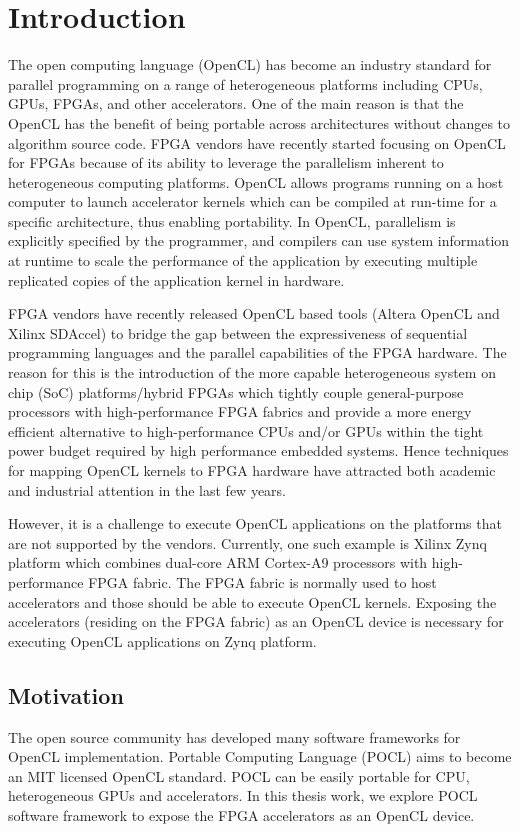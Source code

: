 \chapter{Introduction}
\label{ch1_introduction}
The open computing language (OpenCL) has become an industry standard for parallel programming on a range of heterogeneous platforms including CPUs, GPUs, FPGAs, and other accelerators. One of the main reason is that the OpenCL has the benefit of being portable across architectures without changes to algorithm source code.
FPGA vendors have recently started focusing on OpenCL for FPGAs because of its ability to leverage the parallelism inherent to heterogeneous computing platforms. OpenCL allows programs running on a host computer to launch accelerator kernels which can be compiled at run-time for a specific architecture, thus enabling portability.
In OpenCL, parallelism is explicitly specified by the programmer, and compilers can use system information at runtime to scale the performance of the application by executing multiple replicated copies of the application kernel in hardware.

FPGA vendors have recently released OpenCL based tools (Altera OpenCL and Xilinx SDAccel) to bridge the gap between the expressiveness of sequential programming languages and the parallel capabilities of the FPGA hardware. The reason for this is the introduction of the more capable heterogeneous system on chip (SoC) platforms/hybrid FPGAs which tightly couple general-purpose processors with high-performance FPGA fabrics and provide a more energy efficient alternative to high-performance CPUs and/or GPUs
within the tight power budget required by high performance embedded systems. Hence techniques for mapping OpenCL kernels to FPGA hardware have attracted both academic and industrial attention in the last few years.

However, it is a challenge to execute OpenCL applications on the platforms that are not supported by the vendors. Currently, one such example is Xilinx Zynq platform which combines dual-core ARM Cortex-A9 processors with high-performance FPGA fabric. The FPGA fabric is normally used to host accelerators and those should be able to execute OpenCL kernels. Exposing the accelerators (residing on the FPGA fabric) as an OpenCL device is necessary for executing OpenCL applications on Zynq platform.

\section{Motivation}
The open source community has developed many software frameworks for OpenCL implementation. Portable Computing Language (POCL) aims to become an MIT licensed OpenCL standard. POCL can be easily portable for CPU, heterogeneous GPUs and accelerators. In this thesis work, we explore POCL software framework to expose the FPGA accelerators as an OpenCL device.

